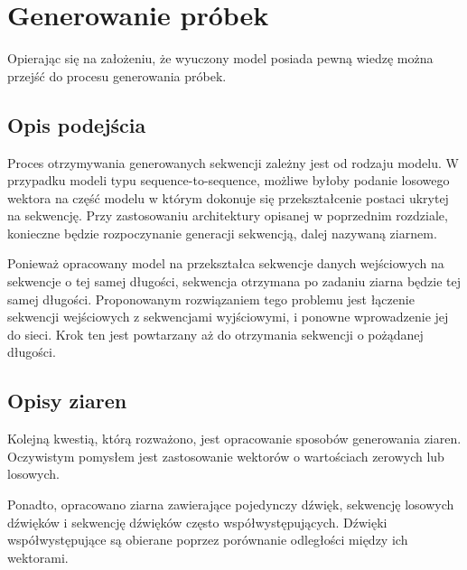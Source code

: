 \chapter{Generowanie próbek} 
{
    Opierając się na założeniu, że wyuczony model posiada pewną wiedzę można przejść
    do procesu generowania próbek.

    \section{Opis podejścia}
    {
        Proces otrzymywania generowanych sekwencji zależny jest od rodzaju modelu.
        W przypadku modeli typu sequence-to-sequence, możliwe byłoby podanie losowego 
        wektora na część modelu w którym dokonuje się przekształcenie postaci ukrytej na sekwencję.
        Przy zastosowaniu architektury opisanej w poprzednim rozdziale, konieczne będzie 
        rozpoczynanie generacji sekwencją, dalej nazywaną ziarnem. 

        Ponieważ opracowany model na przekształca sekwencje danych wejściowych na sekwencje
        o tej samej długości, sekwencja otrzymana po zadaniu ziarna będzie tej samej długości.
        Proponowanym rozwiązaniem tego problemu jest łączenie sekwencji wejściowych z sekwencjami wyjściowymi,
        i ponowne wprowadzenie jej do sieci. Krok ten jest powtarzany aż do otrzymania sekwencji o pożądanej długości.
        
    }

    \section{Opisy ziaren}
    {
        Kolejną kwestią, którą rozważono, jest opracowanie sposobów generowania ziaren.
        Oczywistym pomysłem jest zastosowanie wektorów o wartościach zerowych lub losowych.

        Ponadto, opracowano ziarna zawierające pojedynczy dźwięk, sekwencję losowych dźwięków
        i sekwencję dźwięków często współwystępujących. Dźwięki współwystępujące są obierane poprzez
        porównanie odległości między ich wektorami.

    }
}